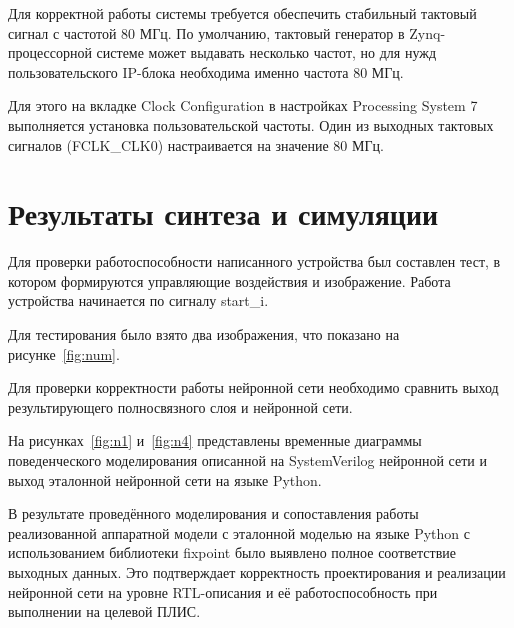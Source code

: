 
Для корректной работы системы требуется обеспечить стабильный тактовый сигнал с 
частотой 80 МГц. По умолчанию, тактовый генератор в Zynq-процессорной системе 
может выдавать несколько частот, но для нужд пользовательского IP-блока 
необходима именно частота 80 МГц.

Для этого на вкладке Clock Configuration в настройках Processing System 7 
выполняется установка пользовательской частоты. Один из выходных тактовых 
сигналов (FCLK\_CLK0) настраивается на значение 80 МГц.

\section{Результаты синтеза и симуляции}
\hspace*{12.5 mm}Для проверки работоспособности написанного устройства был 
составлен тест, в котором формируются управляющие воздействия и изображение. 
Работа устройства начинается по сигналу start\_i. 

Для тестирования было взято два изображения, что показано на 
рисунке~\ref{fig:num}.


Для проверки корректности работы нейронной 
сети необходимо сравнить выход результирующего полносвязного слоя и нейронной 
сети. 

На рисунках~\ref{fig:n1} и~\ref{fig:n4} представлены временные диаграммы 
поведенческого моделирования описанной на SystemVerilog нейронной сети и выход 
эталонной нейронной сети на языке Python.


В результате проведённого моделирования и сопоставления работы реализованной 
аппаратной модели с эталонной моделью на языке Python с использованием
библиотеки fixpoint было выявлено полное соответствие выходных данных. Это 
подтверждает корректность проектирования и реализации нейронной сети на 
уровне RTL-описания и её работоспособность при выполнении на целевой ПЛИС.

